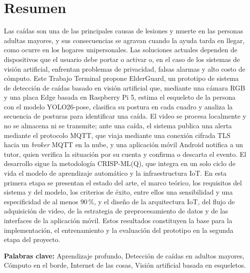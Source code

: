 \documentclass[12pt,a4paper,oneside]{book}
\theoremstyle{plain}
\theoremstyle{definition}
\theoremstyle{remark}
\begin{document}
\frontmatter
\pagestyle{plain}


\chapter*{Resumen}

Las caídas son una de las principales causas de lesiones y muerte en las personas adultas mayores, y sus consecuencias se agravan cuando la ayuda tarda en llegar, como ocurre en los hogares unipersonales. Las soluciones actuales dependen de dispositivos que el usuario debe portar o activar o, en el caso de los sistemas de visión artificial, enfrentan problemas de privacidad, falsas alarmas y alto costo de cómputo. Este Trabajo Terminal propone ElderGuard, un prototipo de sistema de detección de caídas basado en visión artificial que, mediante una cámara RGB y una placa Edge basada en Raspberry Pi 5, estima el esqueleto de la persona con el modelo YOLO26-pose, clasifica su postura en cada cuadro y analiza la secuencia de posturas para identificar una caída. El video se procesa localmente y no se almacena ni se transmite; ante una caída, el sistema publica una alerta mediante el protocolo MQTT, que viaja mediante una conexión cifrada TLS hacia un \textit{broker} MQTT en la nube, y una aplicación móvil Android notifica a un tutor, quien verifica la situación por su cuenta y confirma o descarta el evento. El desarrollo sigue la metodología CRISP-ML(Q), que integra en un solo ciclo de vida el modelo de aprendizaje automático y la infraestructura IoT. En esta primera etapa se presentan el estado del arte, el marco teórico, los requisitos del sistema y del modelo, los criterios de éxito, entre ellos una sensibilidad y una especificidad de al menos 90\,\%, y el diseño de la arquitectura IoT, del flujo de adquisición de video, de la estrategia de preprocesamiento de datos y de las interfaces de la aplicación móvil. Estos resultados constituyen la base para la implementación, el entrenamiento y la evaluación del prototipo en la segunda etapa del proyecto.


\vspace{1em}
\noindent\textbf{Palabras clave:} Aprendizaje profundo, Detección de caídas en adultos mayores, Cómputo en el borde, Internet de las cosas, Visión artificial basada en esqueletos.
\end{document}
